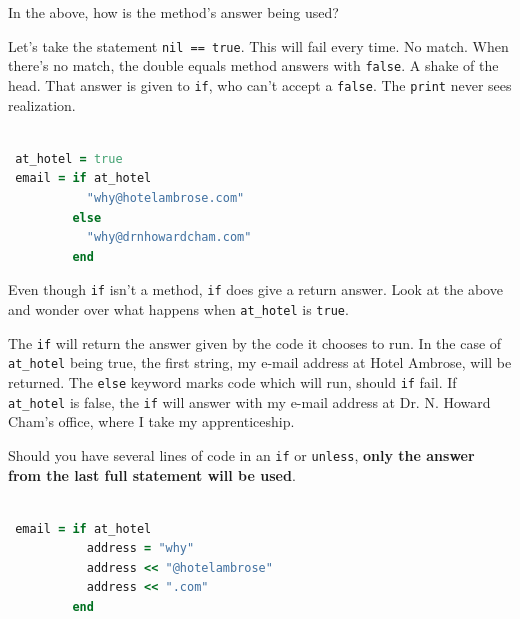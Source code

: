 \documentclass[10pt,twoside]{report}
\begin{document}
In the above, how is the method's answer being used?

Let's take the statement \lstinline[breaklines=true]|nil == true|.
This will fail every time.  No match.  When there's no match, the
double equals method answers with \lstinline[breaklines=true]|false|.
A shake of the head. That answer is given to
\lstinline[breaklines=true]|if|, who can't accept a
\lstinline[breaklines=true]|false|.  The
\lstinline[breaklines=true]|print| never sees realization.


\begin{lstlisting}[basicstyle=\ttfamily\color{basiccolor},
    commentstyle = \ttfamily\color{commentcolor},
    keywordstyle=\ttfamily\color{keywordscolor},
    stringstyle=\color{stringcolor},
    language=Ruby,
    basicstyle=\small\ttfamily,
    showstringspaces=false,
  ]

 at_hotel = true 
 email = if at_hotel 
           "why@hotelambrose.com" 
         else
           "why@drnhowardcham.com" 
         end

\end{lstlisting}


Even though \lstinline[breaklines=true]|if| isn't a method,
\lstinline[breaklines=true]|if| does give a return answer.  Look at
the above and wonder over what happens when
\lstinline[breaklines=true]|at_hotel| is
\lstinline[breaklines=true]|true|.

The \lstinline[breaklines=true]|if| will return the answer given by
the code it chooses to run.  In the case of
\lstinline[breaklines=true]|at_hotel| being true, the first string, my
e-mail address at Hotel Ambrose, will be returned.  The
\lstinline[breaklines=true]|else| keyword marks code which will run,
should \lstinline[breaklines=true]|if| fail.  If
\lstinline[breaklines=true]|at_hotel| is false, the
\lstinline[breaklines=true]|if| will answer with my e-mail address at
Dr. N. Howard Cham's office, where I take my apprenticeship.

Should you have several lines of code in an
\lstinline[breaklines=true]|if| or
\lstinline[breaklines=true]|unless|, {\bf only the answer from the
  last full statement will be used}.


\begin{lstlisting}[basicstyle=\ttfamily\color{basiccolor},
    commentstyle = \ttfamily\color{commentcolor},
    keywordstyle=\ttfamily\color{keywordscolor},
    stringstyle=\color{stringcolor},
    language=Ruby,
    basicstyle=\small\ttfamily,
    showstringspaces=false,
  ]

 email = if at_hotel 
           address = "why" 
           address << "@hotelambrose"
           address << ".com"
         end

\end{lstlisting}
\end{document}
